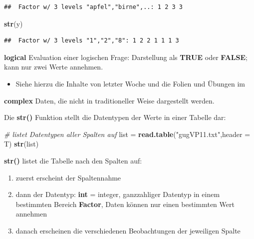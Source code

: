 \documentclass[]{book}
\newenvironment{Shaded}{\begin{snugshade}}{\end{snugshade}}
\newcommand{\KeywordTok}[1]{\textcolor[rgb]{0.13,0.29,0.53}{\textbf{#1}}}
\newcommand{\DataTypeTok}[1]{\textcolor[rgb]{0.13,0.29,0.53}{#1}}
\newcommand{\StringTok}[1]{\textcolor[rgb]{0.31,0.60,0.02}{#1}}
\newcommand{\CommentTok}[1]{\textcolor[rgb]{0.56,0.35,0.01}{\textit{#1}}}
\newcommand{\NormalTok}[1]{#1}
\providecommand{\tightlist}{%
  \setlength{\itemsep}{0pt}\setlength{\parskip}{0pt}}
\begin{document}
\begin{verbatim}
##  Factor w/ 3 levels "apfel","birne",..: 1 2 3 3
\end{verbatim}

\begin{Shaded}
\begin{Highlighting}[]
\KeywordTok{str}\NormalTok{(y)}
\end{Highlighting}
\end{Shaded}

\begin{verbatim}
##  Factor w/ 3 levels "1","2","8": 1 2 2 1 1 1 3
\end{verbatim}

\textbf{logical} Evaluation einer logischen Frage: Darstellung als
\textbf{TRUE} oder \textbf{FALSE}; kann nur zwei Werte annehmen.

\begin{itemize}
\tightlist
\item
  Siehe hierzu die Inhalte von letzter Woche und die Folien und Übungen
  im
\end{itemize}

\textbf{complex} Daten, die nicht in traditioneller Weise dargestellt
werden.

Die \textbf{str()} Funktion stellt die Datentypen der Werte in einer
Tabelle dar:

\begin{Shaded}
\begin{Highlighting}[]
\CommentTok{# listet Datentypen aller Spalten auf}
\NormalTok{list =}\StringTok{ }\KeywordTok{read.table}\NormalTok{(}\StringTok{"gugVP11.txt"}\NormalTok{,}\DataTypeTok{header =}\NormalTok{ T)}
\KeywordTok{str}\NormalTok{(list)}
\end{Highlighting}
\end{Shaded}

\textbf{str()} listet die Tabelle nach den Spalten auf:

\begin{enumerate}
\def\labelenumi{\arabic{enumi}.}
\tightlist
\item
  zuerst erscheint der Spaltennahme
\item
  dann der Datentyp: \textbf{int} = integer, ganzzahliger Datentyp in
  einem bestimmten Bereich \textbf{Factor}, Daten können nur einen
  bestimmten Wert annehmen
\item
  danach erscheinen die verschiedenen Beobachtungen der jeweiligen
  Spalte
\end{enumerate}
\end{document}
